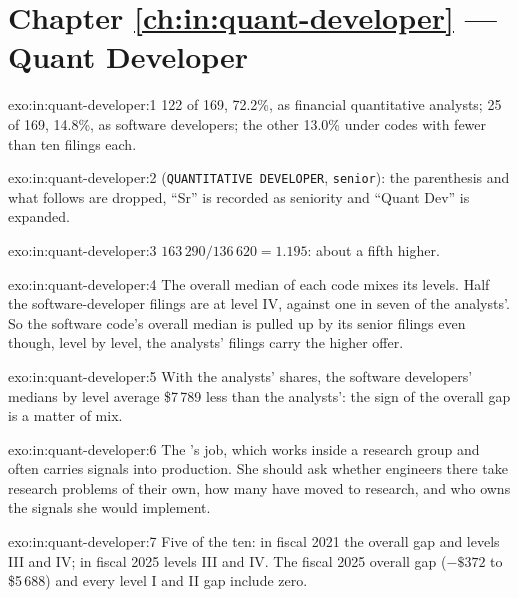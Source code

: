 \section*{Chapter \ref{ch:in:quant-developer} --- Quant Developer}

\begin{solution}{exo:in:quant-developer:1}
122 of 169, 72.2\%, as financial quantitative analysts; 25 of 169, 14.8\%, as software developers; the other 13.0\% under
codes with fewer than ten filings each.
\end{solution}

\begin{solution}{exo:in:quant-developer:2}
(\texttt{QUANTITATIVE DEVELOPER}, \texttt{senior}): the parenthesis and what follows are dropped, ``Sr'' is recorded as
seniority and ``Quant Dev'' is expanded.
\end{solution}

\begin{solution}{exo:in:quant-developer:3}
$163\,290/136\,620=1.195$: about a fifth higher.
\end{solution}

\begin{solution}{exo:in:quant-developer:4}
The overall median of each code mixes its levels. Half the software-developer filings are at level IV, against one in
seven of the analysts'. So the software code's overall median is pulled up by its senior filings even though, level by
level, the analysts' filings carry the higher offer.
\end{solution}

\begin{solution}{exo:in:quant-developer:5}
With the analysts' shares, the software developers' medians by level average \$7\,789 less than the analysts': the sign of
the overall gap is a matter of mix.
\end{solution}

\begin{solution}{exo:in:quant-developer:6}
The 's job, which works inside a research group and often carries signals into production. She should
ask whether engineers there take research problems of their own, how many have moved to research, and who owns the
signals she would implement.
\end{solution}

\begin{solution}{exo:in:quant-developer:7}
Five of the ten: in fiscal 2021 the overall gap and levels III and IV; in fiscal 2025 levels III and IV. The fiscal 2025
overall gap ($-\$372$ to \$5\,688) and every level I and II gap include zero.
\end{solution}

